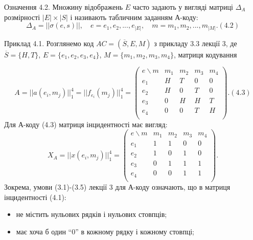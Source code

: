 \begin{definition}
    Означення 4.2. Множину відображень $E$ часто задають у вигляді
    матриці $\Delta_A$ розмірності $|E| \times |S|$ і називають табличним заданням А-коду:
    \begin{equation*}
        \Delta_A = ||\sigma(e,s)||, \quad e = e_1, e_2, ..., e_{|E|},  \quad m = m_1, m_2, ..., m_{|M|}. (4.2)
    \end{equation*}
\end{definition}
\begin{example}
    Приклад 4.1. Розглянемо код $AC=(\overline{S}, E, M)$ з прикладу 3.3 лекції 3, де $\overline{S} = \{H, T\}$,
    $E = \{e_1, e_2, e_3, e_4\}$, $M = \{m_1, m_2, m_3, m_4\}$, матриця кодування

    \begin{equation*}
        A = ||a(e_i, m_j)||_1^4 = ||f_{e_i}(m_j)||_1^4
        = \begin{pmatrix}
            e\backslash m & m_1 & m_2 & m_3 & m_4 \\
            e_1 & H & T & 0 & 0 \\
            e_2 & H & 0 & T & 0 \\
            e_3 & 0 & H & H & T \\
            e_4 & 0 & 0 & T & H \\
        \end{pmatrix}. (4.3)
    \end{equation*}
    Для А-коду (4.3) матриця інцидентності має вигляд:
    \begin{equation*}
        X_A = ||x(e_i, m_j)||_1^4
        = \begin{pmatrix}
            e\backslash m & m_1 & m_2 & m_3 & m_4 \\
            e_1 & 1 & 1 & 0 & 0 \\
            e_2 & 1 & 0 & 1 & 0 \\
            e_3 & 0 & 1 & 1 & 1 \\
            e_4 & 0 & 0 & 1 & 1 \\
        \end{pmatrix}.
    \end{equation*}
    Зокрема, умови (3.1)-(3.5) лекції 3 для А-коду означають, що в матриця
    інцидентності (4.1):
    \begin{itemize}
        \item не містить нульових рядків і нульових стовпців;
        \item має хоча б один ``0'' в кожному рядку і кожному стовпці;

\end{itemize}
\end{example}
